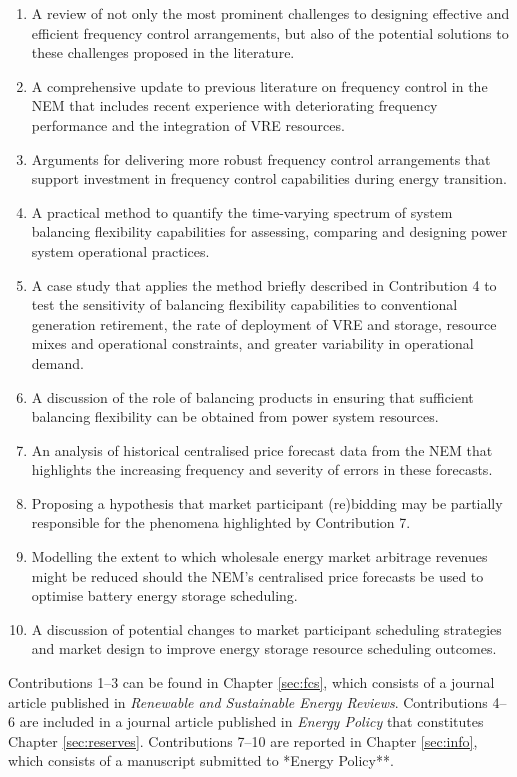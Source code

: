 \documentclass[12pt,a4paper,]{report}
\providecommand{\tightlist}{%
  \setlength{\itemsep}{0pt}\setlength{\parskip}{0pt}}
\begin{document}
\begin{enumerate}
\def\labelenumi{\arabic{enumi}.}
\tightlist
\item
  A review of not only the most prominent challenges to designing
  effective and efficient frequency control arrangements, but also of
  the potential solutions to these challenges proposed in the
  literature.
\item
  A comprehensive update to previous literature on frequency control in
  the NEM that includes recent experience with deteriorating frequency
  performance and the integration of VRE resources.
\item
  Arguments for delivering more robust frequency control arrangements
  that support investment in frequency control capabilities during
  energy transition.
\item
  A practical method to quantify the time-varying spectrum of system
  balancing flexibility capabilities for assessing, comparing and
  designing power system operational practices.
\item
  A case study that applies the method briefly described in Contribution
  4 to test the sensitivity of balancing flexibility capabilities to
  conventional generation retirement, the rate of deployment of VRE and
  storage, resource mixes and operational constraints, and greater
  variability in operational demand.
\item
  A discussion of the role of balancing products in ensuring that
  sufficient balancing flexibility can be obtained from power system
  resources.
\item
  An analysis of historical centralised price forecast data from the NEM
  that highlights the increasing frequency and severity of errors in
  these forecasts.
\item
  Proposing a hypothesis that market participant (re)bidding may be
  partially responsible for the phenomena highlighted by Contribution 7.
\item
  Modelling the extent to which wholesale energy market arbitrage
  revenues might be reduced should the NEM's centralised price forecasts
  be used to optimise battery energy storage scheduling.
\item
  A discussion of potential changes to market participant scheduling
  strategies and market design to improve energy storage resource
  scheduling outcomes.
\end{enumerate}

Contributions 1--3 can be found in Chapter \ref{sec:fcs}, which consists
of a journal article published in \emph{Renewable and Sustainable Energy
Reviews}. Contributions 4--6 are included in a journal article published
in \emph{Energy Policy} that constitutes Chapter \ref{sec:reserves}.
Contributions 7--10 are reported in Chapter \ref{sec:info}, which
consists of a manuscript submitted to *Energy Policy**.
\end{document}
